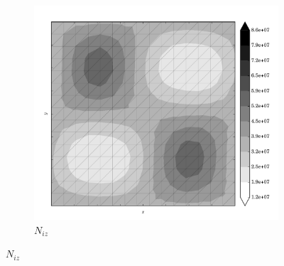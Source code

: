 \begin{figure}
  \begin{subfigure}[b]{0.3\linewidth}
    \includegraphics[width=\linewidth]{images/stress_balance/BP/N_iz.pdf}
  \caption{$N_{iz}$}
  \label{bp_N_iz}
  \end{subfigure}


\end{figure}
